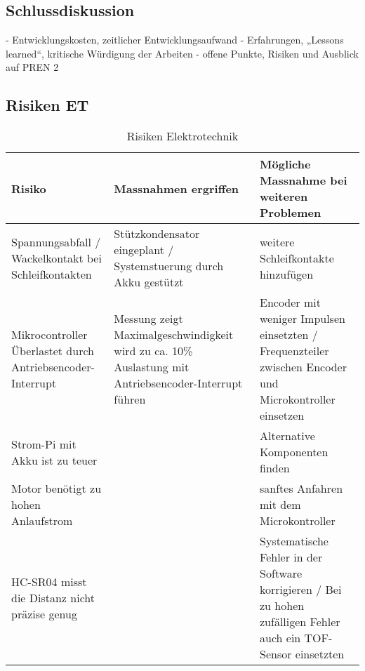\documentclass[../../main.tex]{subfiles}
\begin{document}
\subsection{Schlussdiskussion}

- Entwicklungskosten, zeitlicher Entwicklungsaufwand
- Erfahrungen, „Lessons learned“, kritische Würdigung der Arbeiten
- offene Punkte, Risiken und Ausblick auf PREN 2


\subsection{Risiken ET}
\begin{table}[H]
    \begin{tabular}{|p{}|p{}|p{}|}
    \hline
    \textbf{Risiko}                                            & \textbf{Massnahmen ergriffen}                                                                         & \textbf{Mögliche Massnahme bei weiteren Problemen}                                                                \\ \hline
    Spannungsabfall / Wackelkontakt bei Schleifkontakten       & Stützkondensator eingeplant / Systemstuerung durch Akku gestützt                                      & weitere Schleifkontakte hinzufügen                                                                                \\ \hline
    Mikrocontroller Überlastet durch Antriebsencoder-Interrupt & Messung zeigt Maximalgeschwindigkeit wird zu ca. 10\% Auslastung mit Antriebsencoder-Interrupt führen & Encoder mit weniger Impulsen einsetzten / Frequenzteiler zwischen Encoder und Microkontroller einsetzen           \\ \hline
    Strom-Pi mit Akku ist zu teuer                             &                                                                                                       & Alternative Komponenten finden                                                                                    \\ \hline
    Motor benötigt zu hohen Anlaufstrom                        &                                                                                                       & sanftes Anfahren mit dem Microkontroller                                                                          \\ \hline
    HC-SR04 misst die Distanz nicht präzise genug              &                                                                                                       & Systematische Fehler in der Software korrigieren / Bei zu hohen zufälligen Fehler auch ein TOF-Sensor einsetzten  \\ \hline
    \end{tabular}
    \caption{Risiken Elektrotechnik}
    \label{tab:risk_et}
    \end{table}
\end{document}
